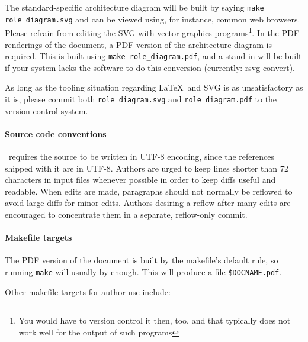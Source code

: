 \documentclass[11pt,a4paper]{ivoa}
\begin{document}
The standard-specific
architecture diagram will be built by saying \texttt{make
role\_diagram.svg} and can be viewed using, for instance, common web
browsers.  Please refrain from editing the SVG with vector graphics
programs\footnote{You would have to version control it then, too, and that
typically does not work well for the output of such programs}.
In the PDF renderings of the document,
a PDF version of the architecture diagram is
required.  This is built using \texttt{make role\_diagram.pdf}, and a
stand-in will be built if your system lacks the software to do this
conversion (currently: rsvg-convert).

As long as the tooling situation regarding \LaTeX~and SVG is as
unsatisfactory as it is, please commit both \texttt{role\_diagram.svg} and
\texttt{role\_diagram.pdf} to the version control system.

\paragraph{Source code conventions}

\ivoatex\ requires the source to be written in UTF-8 encoding, since the
references shipped with it are in UTF-8.
Authors are urged to keep lines shorter than 72 characters in input
files whenever possible in order to keep diffs useful and readable.
When edits are made, paragraphs should not normally be reflowed to avoid
large diffs for minor edits.  Authors desiring a reflow after many edits
are encouraged to concentrate them in a separate, reflow-only commit.

\paragraph{Makefile targets}

The PDF version of the document is built by the makefile's default rule,
so running \texttt{make} will usually by enough.  This will produce a
file \texttt{\$DOCNAME.pdf}.

Other makefile targets for author use include:
\end{document}
